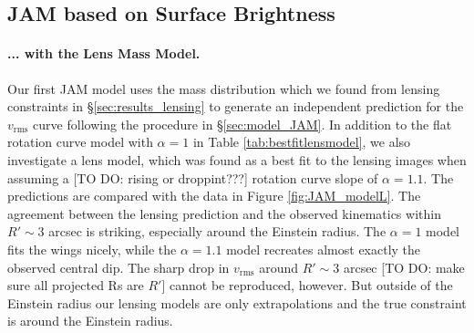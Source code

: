 \subsection{JAM based on Surface Brightness}

\paragraph{... with the Lens Mass Model.} Our first JAM model uses the mass distribution which we found from lensing constraints in \S\ref{sec:results_lensing} to generate an independent prediction for the $v_\text{rms}$ curve following the procedure in \S\ref{sec:model_JAM}. In addition to the flat rotation curve model with $\alpha = 1$ in Table \ref{tab:bestfitlensmodel}, we also investigate a lens model, which was found as a best fit to the lensing images when assuming a [TO DO: rising or droppint???] rotation curve slope of $\alpha=1.1$. The predictions are compared with the data in Figure \ref{fig:JAM_modelL}. The agreement between the lensing prediction and the observed kinematics within $R' \sim 3$ arcsec is striking, especially around the Einstein radius. The $\alpha = 1$ model fits the wings nicely, while the $\alpha = 1.1$ model recreates almost exactly the observed central dip. The sharp drop in $v_\text{rms}$ around $R' \sim 3$ arcsec [TO DO: make sure all projected Rs are $R'$] cannot be reproduced, however. But outside of the Einstein radius our lensing models are only extrapolations and the true constraint is around the Einstein radius.


